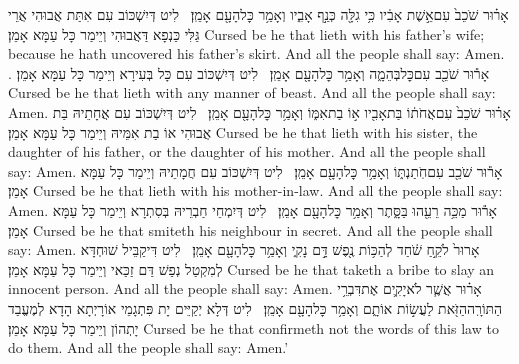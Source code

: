 {אָר֗וּר שֹׁכֵב֙ עִם\maqqaf אֵ֣שֶׁת אָבִ֔יו כִּ֥י גִלָּ֖ה כְּנַ֣ף אָבִ֑יו וְאָמַ֥ר כׇּל\maqqaf הָעָ֖ם אָמֵֽן׃ \setuma }
{לִיט דְּיִשְׁכּוֹב עִם אִתַּת אֲבוּהִי אֲרֵי גַּלִּי כַּנְפָא דַּאֲבוּהִי וְיֵימַר כָּל עַמָּא אָמֵן׃}
{Cursed be he that lieth with his father’s wife; because he hath uncovered his father’s skirt. And all the people shall say: Amen. .}{}
{אָר֕וּר שֹׁכֵ֖ב עִם\maqqaf כׇּל\maqqaf בְּהֵמָ֑ה וְאָמַ֥ר כׇּל\maqqaf הָעָ֖ם אָמֵֽן׃ \setuma }
{לִיט דְּיִשְׁכּוֹב עִם כָּל בְּעִירָא וְיֵימַר כָּל עַמָּא אָמֵן׃}
{Cursed be he that lieth with any manner of beast. And all the people shall say: Amen.}{}
{אָר֗וּר שֹׁכֵב֙ עִם\maqqaf אֲחֹת֔וֹ בַּת\maqqaf אָבִ֖יו א֣וֹ בַת\maqqaf אִמּ֑וֹ וְאָמַ֥ר כׇּל\maqqaf הָעָ֖ם אָמֵֽן׃ \setuma }
{לִיט דְּיִשְׁכּוֹב עִם אֲחָתֵיהּ בַּת אֲבוּהִי אוֹ בַת אִמֵּיהּ וְיֵימַר כָּל עַמָּא אָמֵן׃}
{Cursed be he that lieth with his sister, the daughter of his father, or the daughter of his mother. And all the people shall say: Amen.}{}
{אָר֕וּר שֹׁכֵ֖ב עִם\maqqaf חֹֽתַנְתּ֑וֹ וְאָמַ֥ר כׇּל\maqqaf הָעָ֖ם אָמֵֽן׃ \setuma }
{לִיט דְּיִשְׁכּוֹב עִם חֲמָתֵיהּ וְיֵימַר כָּל עַמָּא אָמֵן׃}
{Cursed be he that lieth with his mother-in-law. And all the people shall say: Amen.}{}
{אָר֕וּר מַכֵּ֥ה רֵעֵ֖הוּ בַּסָּ֑תֶר וְאָמַ֥ר כׇּל\maqqaf הָעָ֖ם אָמֵֽן׃ \setuma }
{לִיט דְּיִמְחֵי חַבְרֵיהּ בְּסִתְרָא וְיֵימַר כָּל עַמָּא אָמֵן׃}
{Cursed be he that smiteth his neighbour in secret. And all the people shall say: Amen.}{}
{אָרוּר֙ לֹקֵ֣חַ שֹׁ֔חַד לְהַכּ֥וֹת נֶ֖פֶשׁ דָּ֣ם נָקִ֑י וְאָמַ֥ר כׇּל\maqqaf הָעָ֖ם אָמֵֽן׃ \setuma }
{לִיט דִּיקַבֵּיל שׁוּחְדָּא לְמִקְטַל נְפַשׁ דַּם זַכַּאי וְיֵימַר כָּל עַמָּא אָמֵן׃}
{Cursed be he that taketh a bribe to slay an innocent person. And all the people shall say: Amen.}{}
{אָר֗וּר אֲשֶׁ֧ר לֹא\maqqaf יָקִ֛ים אֶת\maqqaf דִּבְרֵ֥י הַתּוֹרָֽה\maqqaf הַזֹּ֖את לַעֲשׂ֣וֹת אוֹתָ֑ם וְאָמַ֥ר כׇּל\maqqaf הָעָ֖ם אָמֵֽן׃ \petucha }
{לִיט דְּלָא יְקַיֵּים יָת פִּתְגָמֵי אוֹרָיְתָא הָדָא לְמֶעֱבַד יָתְהוֹן וְיֵימַר כָּל עַמָּא אָמֵן׃}
{Cursed be he that confirmeth not the words of this law to do them. And all the people shall say: Amen.’}{}
